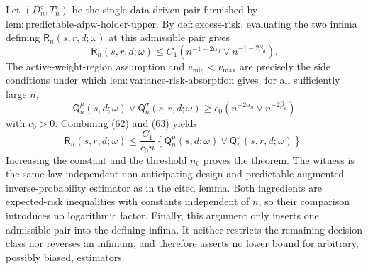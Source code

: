 Let \((D_n^{\circ},T_n^{\circ})\) be the single data-driven pair furnished by \(\mathrm{lem{:}predictable\text{-}aipw\text{-}holder\text{-}upper}\). By \(\mathrm{def{:}excess\text{-}risk}\), evaluating the two infima defining \(\mathsf R_n(s,r,d;\omega)\) at this admissible pair gives
\[
\mathsf R_n(s,r,d;\omega)
\leq C_1\left(n^{-1-2\alpha_d}\vee n^{-1-2\beta_d}\right).
\tag{62}
\]
The active-weight-region assumption and \(v_{\min}<v_{\max}\) are precisely the side conditions under which \(\mathrm{lem{:}variance\text{-}risk\text{-}absorption}\) gives, for all sufficiently large \(n\),
\[
\mathsf Q_n^{\mu}(s,d;\omega)\vee
\mathsf Q_n^{\sigma}(s,r,d;\omega)
\geq c_0\left(n^{-2\alpha_d}\vee n^{-2\beta_d}\right)
\tag{63}
\]
with \(c_0>0\). Combining (62) and (63) yields
\[
\mathsf R_n(s,r,d;\omega)
\leq \frac{C_1}{c_0n}
\left\{\mathsf Q_n^{\mu}(s,d;\omega)\vee
\mathsf Q_n^{\sigma}(s,r,d;\omega)\right\}.
\]
Increasing the constant and the threshold \(n_0\) proves the theorem. The witness is the same law-independent non-anticipating design and predictable augmented inverse-probability estimator as in the cited lemma. Both ingredients are expected-risk inequalities with constants independent of \(n\), so their comparison introduces no logarithmic factor. Finally, this argument only inserts one admissible pair into the defining infima. It neither restricts the remaining decision class nor reverses an infimum, and therefore asserts no lower bound for arbitrary, possibly biased, estimators.